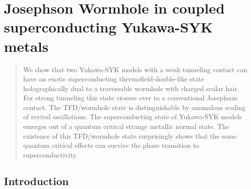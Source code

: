 \renewcommand{\vec}[1]{{\boldsymbol #1}}
\renewcommand{\comment}[1]{[{\color{blue}{#1}}]} 
\def\nn{\nonumber\\}

\newcommand{\cind}[3]{c^{(#1)}_{#2}(#3)}
\newcommand{\cdag}[3]{{c^\dagger}^{(#1)}_{#2}(#3)}
\newcommand{\phind}[3]{\phi^{(#1)}_{#2}(#3)}
\newcommand{\sigmap}{\sigma^\prime}
\newcommand{\taup}{\tau^\prime}

\newcommand{\oemga}{\omega}
\newcommand{\tp}{t^\prime}


\chapter{Josephson Wormhole in coupled superconducting Yukawa-SYK metals}%

\begin{abstract}
\noindent
We show that two Yukawa-SYK models with a weak tunneling contact can have an exotic superconducting thermofield-double-like state holographically dual to a traversable wormhole with charged scalar hair. 
For strong tunneling this state crosses over to a conventional Josephson contact. The TFD/wormhole state is distinguishable by anomalous scaling of revival oscillations. The superconducting state of Yukawa-SYK models emerges out of a quantum critical strange metallic normal state. The existence of this TFD/wormhole state surprisingly shows that the some quantum critical effects can survive the phase transition to superconductivity.
\end{abstract}


\section{Introduction}
\label{sec:introduction}


